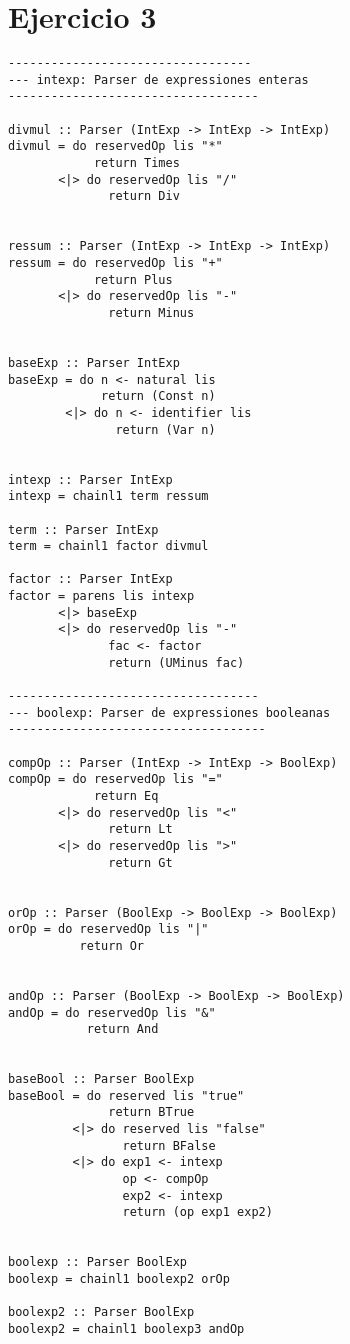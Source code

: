 \documentclass[12pt,a4paper]{article}
\begin{document}
\section*{Ejercicio 3}
\begin{verbatim}
----------------------------------
--- intexp: Parser de expressiones enteras
-----------------------------------

divmul :: Parser (IntExp -> IntExp -> IntExp)
divmul = do reservedOp lis "*"
            return Times
       <|> do reservedOp lis "/"
              return Div


ressum :: Parser (IntExp -> IntExp -> IntExp)
ressum = do reservedOp lis "+"
            return Plus
       <|> do reservedOp lis "-"
              return Minus


baseExp :: Parser IntExp
baseExp = do n <- natural lis
             return (Const n)
        <|> do n <- identifier lis
               return (Var n)


intexp :: Parser IntExp
intexp = chainl1 term ressum 

term :: Parser IntExp
term = chainl1 factor divmul

factor :: Parser IntExp
factor = parens lis intexp
       <|> baseExp
       <|> do reservedOp lis "-"
              fac <- factor
              return (UMinus fac)

-----------------------------------
--- boolexp: Parser de expressiones booleanas
------------------------------------

compOp :: Parser (IntExp -> IntExp -> BoolExp)
compOp = do reservedOp lis "="
            return Eq
       <|> do reservedOp lis "<"
              return Lt
       <|> do reservedOp lis ">"
              return Gt


orOp :: Parser (BoolExp -> BoolExp -> BoolExp)
orOp = do reservedOp lis "|"
          return Or


andOp :: Parser (BoolExp -> BoolExp -> BoolExp)
andOp = do reservedOp lis "&"
           return And


baseBool :: Parser BoolExp
baseBool = do reserved lis "true"
              return BTrue
         <|> do reserved lis "false"
                return BFalse
         <|> do exp1 <- intexp
                op <- compOp
                exp2 <- intexp
                return (op exp1 exp2)


boolexp :: Parser BoolExp
boolexp = chainl1 boolexp2 orOp

boolexp2 :: Parser BoolExp
boolexp2 = chainl1 boolexp3 andOp

\end{verbatim}
\end{document}
